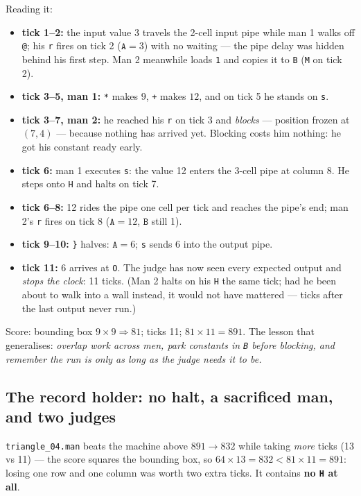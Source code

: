 \documentclass[11pt,a4paper]{article}
\newcommand{\op}[1]{\texttt{#1}}
\begin{document}
Reading it:

\begin{itemize}
  \item \textbf{tick 1--2:} the input value 3 travels the 2-cell input pipe
        while man 1 walks off \op{@}; his \op{r} fires on tick 2
        ($\op{A}=3$) with no waiting --- the pipe delay was hidden behind
        his first step. Man 2 meanwhile loads \op{1} and copies it to
        \op{B} (\op{M} on tick 2).
  \item \textbf{tick 3--5, man 1:} \op{*} makes $9$, \op{+} makes $12$,
        and on tick 5 he stands on \op{s}.
  \item \textbf{tick 3--7, man 2:} he reached his \op{r} on tick 3 and
        \emph{blocks} --- position frozen at $(7,4)$ --- because nothing has
        arrived yet. Blocking costs him nothing: he got his constant ready
        early.
  \item \textbf{tick 6:} man 1 executes \op{s}: the value 12 enters the
        3-cell pipe at column 8. He steps onto \op{H} and halts on tick 7.
  \item \textbf{tick 6--8:} 12 rides the pipe one cell per tick and reaches
        the pipe's end; man 2's \op{r} fires on tick 8 ($\op{A}=12$,
        $\op{B}$ still 1).
  \item \textbf{tick 9--10:} \op{\}} halves: $\op{A}=6$; \op{s} sends 6
        into the output pipe.
  \item \textbf{tick 11:} 6 arrives at \texttt{O}. The judge has now seen
        every expected output and \emph{stops the clock}: 11 ticks. (Man 2
        halts on his \op{H} the same tick; had he been about to walk into a
        wall instead, it would not have mattered --- ticks after the last
        output never run.)
\end{itemize}

Score: bounding box $9\times9\Rightarrow 81$; ticks 11; $81\times11=891$.
The lesson that generalises: \emph{overlap work across men, park constants
in \op{B} before blocking, and remember the run is only as long as the judge
needs it to be.}

\subsection{The record holder: no halt, a sacrificed man, and two judges}
\label{sec:tri3}

\texttt{triangle\_04.man} beats the machine above $891\to 832$ while
taking \emph{more} ticks (13 vs 11) --- the score squares the bounding
box, so $64\times13=832 < 81\times11=891$: losing one row and one column
was worth two extra ticks. It contains \textbf{no \op{H} at all}.
\end{document}
